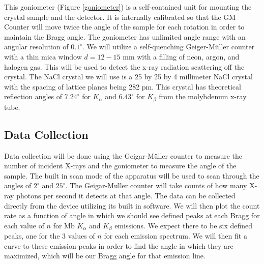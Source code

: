\documentclass[twocolumn]{article}
\begin{document}
			This goniometer (Figure \ref{goniometer}) is a self-contained unit for mounting the crystal sample and the detector. It is internally calibrated so that the GM Counter will move twice the angle of the sample for each rotation in order to maintain the Bragg angle. The goniometer has unlimited angle range with an angular resolution of $0.1^\circ$. We will utilize a self-quenching Geiger-M\"uller counter with a thin mica window $d = 12- 15$ mm with a filling of neon, argon, and halogen gas. This will be used to detect the x-ray radiation scattering off the crystal.	The NaCl crystal we will use is a 25 by 25 by 4 millimeter NaCl crystal with the spacing of lattice planes being 282 pm. This crystal has theoretical reflection angles of $7.24^\circ$ for $K_\alpha$ and $6.43^\circ$ for $K_\beta$ from the molybdenum x-ray tube.
		\subsection{Data Collection}
			Data collection will be done using the Geigar-M\"uller counter to measure the number of incident X-rays and the goniometer to measure the angle of the sample. The built in scan mode of the apparatus will be used to scan through the angles of $2^\circ$ and $25^\circ$. The Geigar-Mu\"ller counter will take counts of how many X-ray photons per second it detects at that angle. The data can be collected directly from the device utilizing its built in software. We will then plot the count rate as a function of angle in which we should see defined peaks at each Bragg for each value of $n$ for Mb $K_\alpha$ and $K_\beta$ emissions. We expect there to be six defined peaks, one for the $3$ values of $n$ for each emission spectrum. We will then fit a curve to these emission peaks in order to find the angle in which they are maximized, which will be our Bragg angle for that emission line.
\end{document}
